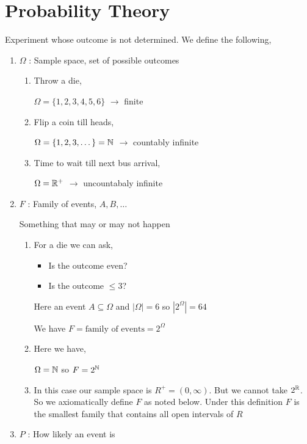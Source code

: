 \section{Probability Theory}

     
Experiment whose outcome is not determined. We define the following, 

\begin{enumerate}
    \item $\Omega$ : Sample space, set of possible outcomes
        \begin{eg}
            \begin{enumerate}
                \item Throw a die,

                    $\Omega= \{1,2,3,4,5,6\}$ $\rightarrow$ finite 
                \item Flip a coin till heads,

                    $\Omega = \{1, 2,3, \dots\} = \mathbb{N}$ $\rightarrow$ countably infinite
                \item Time to wait till next bus arrival, 

                    $\Omega = \mathbb{R}^{+}$ $\rightarrow$ uncountabaly infinite 
            \end{enumerate}
        \end{eg}
    \item $F$ : Family of events, $A, B,  \dots$ 

        Something that may or may not happen

        \begin{eg}
            \begin{enumerate}
                \item For a die we can ask,
                    \begin{itemize}
                        \item Is the outcome even?
                        \item Is the outcome $\le 3$?
                    \end{itemize}
                    Here an event $A \subseteq \Omega$ and $|\Omega| = 6$ so  $|2^{\Omega}| = 64$

                    We have $F = \text{family of events} = 2^{\Omega}$

                \item Here we have, 

                    $\Omega = \mathbb{N}$ so  $F = 2^{\mathbb{N}}$

                \item In this case our sample space is $R^{+} = (0 , \infty)$. But we cannot take $2^{\mathbb{R}}$. So we axiomatically define $F$ as noted below. Under this definition $F$ is the smallest family that contains all open intervals of $R$


            \end{enumerate}
        \end{eg}
    \item $P$ : How likely an event is 
\end{enumerate}


